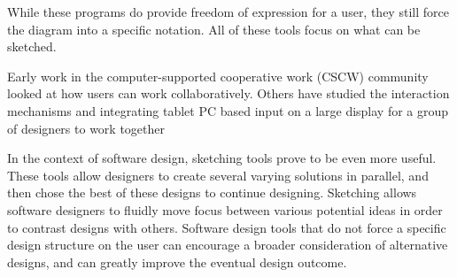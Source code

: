 While these programs do provide freedom of expression for a user, they still force the diagram into a specific notation. All of these tools focus on what can be sketched.

Early work in the computer-supported cooperative work (CSCW) community looked at how users can work collaboratively. Others have studied the interaction mechanisms and integrating tablet PC based input on a large display for a group of designers to work together\cite{todo}


In the context of software design, sketching tools prove to be even more useful. These tools allow designers to create several varying solutions in parallel, and then chose the best of these designs to continue designing. Sketching allows software designers to fluidly move focus between various potential ideas in order to contrast designs with others. Software design tools that do not force a specific design structure on the user can encourage a broader consideration of alternative designs, and can greatly improve the eventual design outcome.
